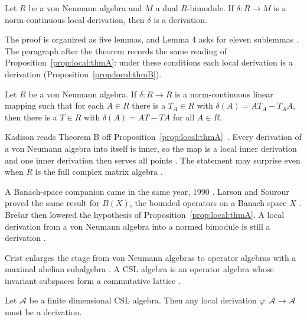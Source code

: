\begin{proposition}\label{prop:local:thmA}
Let $R$ be a von Neumann algebra and $M$ a dual $R$-bimodule. If
$\delta\colon R\to M$ is a norm-continuous local derivation, then $\delta$
is a derivation.
\end{proposition}

The proof is organized as five lemmas, and Lemma 4 asks for eleven sublemmas
\cite[p.~496]{Kadison1990Local}. The paragraph after the theorem records the
same reading of Proposition~\ref{prop:local:thmA}: under these conditions each
local derivation is a derivation \cite[p.~496]{Kadison1990Local}
(Proposition~\ref{prop:local:thmB}).

\begin{proposition}\label{prop:local:thmB}
Let $R$ be a von Neumann algebra. If $\delta\colon R\to R$ is a
norm-continuous linear mapping such that for each $A\in R$ there is a
$T_{A}\in R$ with $\delta(A)=AT_{A}-T_{A}A$, then there is a $T\in R$
with $\delta(A)=AT-TA$ for all $A\in R$.
\end{proposition}

Kadison reads Theorem B off Proposition~\ref{prop:local:thmA}~\cite[p.~494]{Kadison1990Local}. Every
derivation of a von Neumann algebra into itself is inner, so the map is a
local inner derivation and one inner derivation then serves all points
\cite[p.~507]{Kadison1990Local}. The statement may surprise even when $R$
is the full complex matrix algebra \cite[p.~494]{Kadison1990Local}.

A Banach-space companion came in the same year, 1990
\cite[p.~78]{Crist1996Local}. Larson and Sourour proved the same result for
$B(X)$, the bounded operators on a Banach space $X$
\cite[p.~78]{Crist1996Local}.
Bre\v{s}ar then lowered the hypothesis of Proposition~\ref{prop:local:thmA}.
A local derivation from a von Neumann algebra into a normed bimodule is
still a derivation \cite[p.~78]{Crist1996Local}.

Crist enlarges the stage from von Neumann algebras to operator algebras
with a maximal abelian subalgebra \cite[p.~76]{Crist1996Local}. A CSL
algebra is an operator algebra whose invariant subspaces form a commutative
lattice \cite[p.~76]{Crist1996Local}.

\begin{theorem}\label{thm:local:csl}
Let $\mathcal{A}$ be a finite dimensional CSL algebra. Then any local
derivation $\varphi\colon\mathcal{A}\to\mathcal{A}$ must be a derivation.
\end{theorem}

